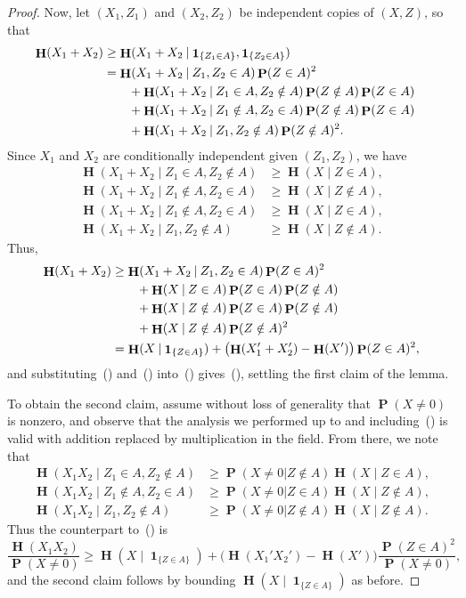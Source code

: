 \documentclass[twoside, 10pt]{article}
\renewcommand{\eqref}[1]{\textup{{\normalfont(\oldstylenums{\ref{#1}}}\normalfont)}}
\DeclareMathOperator{\Eta}{\mathbf{H}}
\DeclareMathOperator{\pr}{\mathbf{P}}
\newcommand\given{\mathbin{|}}
\newcommand{\one}{\mathop{\mathbf{1}}\nolimits}
\begin{document}
\begin{proof}
Now, let $(X_1, Z_1)$ and $(X_2, Z_2)$ be independent copies of $(X,Z)$, so that
\begin{equation}\begin{aligned}\label{eqcheckpoint}
\Eta(X_1 + X_2) &\ge \Eta(X_1 + X_2\given \one_{\{Z_1\in A\}}, 
\one_{\{Z_2\in A\}}) \cr
&= \Eta(X_1 + X_2 \given Z_1, Z_2\in A) \pr(Z\in A)^2 \cr
&\qquad + \Eta(X_1 + X_2 \given Z_1\in A, Z_2\notin A) 
\pr(Z\notin A)\pr(Z\in A) \cr
&\qquad + \Eta(X_1 + X_2 \given Z_1\notin A, Z_2\in A)
\pr(Z\notin A)\pr(Z\in A) \cr
&\qquad + \Eta(X_1 + X_2 \given Z_1, Z_2\notin A) \pr(Z\notin A)^2.
\end{aligned}\end{equation}
Since $X_1$ and $X_2$ are conditionally independent 
given $(Z_1, Z_2)$, we have
\begin{align*}  
\Eta(X_1 + X_2 \given Z_1\in A, Z_2\notin A) &\ge \Eta(X\given Z\in A),\\
\Eta(X_1 + X_2 \given Z_1\notin A, Z_2\in A) &\ge \Eta(X\given Z\notin A),\\
\Eta(X_1 + X_2 \given Z_1\notin A, Z_2\in A) &\ge \Eta(X\given Z\in A),\\
\Eta(X_1 + X_2 \given Z_1, Z_2\notin A) &\ge \Eta(X\given Z\notin A).
\end{align*}
Thus,
\begin{equation}\begin{aligned}\label{eqadditioncounterpart}
\Eta(X_1 + X_2) &\ge \Eta(X_1 + X_2 \given Z_1, Z_2\in A) \pr(Z\in A)^2 \cr
&\qquad+\Eta(X\given Z\in A)   \pr(Z\in A)\pr(Z\notin A)  \\
&\qquad+\Eta(X\given Z\notin A)\pr(Z\in A)\pr(Z\notin A) \cr 
&\qquad+\Eta(X\given Z\notin A)\pr(Z\notin A)^2\cr
&= \Eta(X\given \one_{\{Z\in A\}}) + \bigl(\Eta(X_1'+X_2') 
- \Eta(X')\bigr)\pr(Z\in A)^2, 
\end{aligned}\end{equation}
and substituting~\eqref{eqCoverlog} and~\eqref{eqloglogoverlog} 
into~\eqref{eqadditioncounterpart} gives~\eqref{eq:firstclaim},
settling the first claim of the lemma.

To obtain the second claim, 
assume without loss of generality that 
$\pr(X\neq 0)$ is nonzero, and
observe that the analysis we performed up to and including~\eqref{eqcheckpoint} is valid with addition replaced by multiplication in the field. 
From there, we note that
\begin{align*}
\Eta(X_1 X_2 \given Z_1\in A, Z_2\notin A) 
&\ge \pr(X\ne 0|Z\notin A)
\Eta(X\given Z\in A),\\
\Eta(X_1 X_2 \given Z_1\notin A, Z_2\in A) 
&\ge \pr(X\ne 0|Z\in A)
\Eta(X\given Z\notin A),\\
\Eta(X_1 X_2 \given Z_1, Z_2\notin A) 
&\ge \pr(X\ne 0|Z\notin A)
\Eta(X\given Z\notin A).
\end{align*}
Thus the counterpart to~\eqref{eqadditioncounterpart} is
$$\frac{\Eta(X_1X_2)}{\pr(X\ne 0)}\ge 
\Eta(X\given \one_{\{Z\in A\}}) + 
\bigl(\Eta(X_1'X_2') - \Eta(X')\bigr)\frac{\pr(Z\in A)^2}{\pr(X\ne 0)},$$
and the second claim follows by 
bounding $\Eta(X\given \one_{\{Z\in A\}})$ as before. 
\end{proof}
\end{document}
